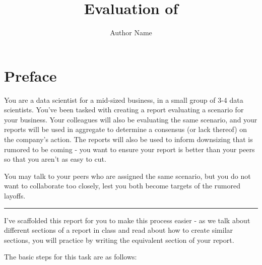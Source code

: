 \documentclass[
  letterpaper,
  DIV=11,
  numbers=noendperiod]{scrreprt}
\title{Evaluation of}
\author{Author Name}
\date{}
\renewcommand*\contentsname{Table of contents}
\newcommand\contentsname{Table of contents}
\begin{document}
\maketitle
\ifdefined\Shaded\renewenvironment{Shaded}{\begin{tcolorbox}[breakable, borderline west={3pt}{0pt}{shadecolor}, interior hidden, boxrule=0pt, sharp corners, frame hidden, enhanced]}{\end{tcolorbox}}\fi

\renewcommand*\contentsname{Table of contents}
{
\hypersetup{linkcolor=}
\setcounter{tocdepth}{2}
\tableofcontents
}

\hypertarget{preface}{%
\chapter*{Preface}\label{preface}}


You are a data scientist for a mid-sized business, in a small group of
3-4 data scientists. You've been tasked with creating a report
evaluating a scenario for your business. Your colleagues will also be
evaluating the same scenario, and your reports will be used in aggregate
to determine a consensus (or lack thereof) on the company's action. The
reports will also be used to inform downsizing that is rumored to be
coming - you want to ensure your report is better than your peers so
that you aren't as easy to cut.

You may talk to your peers who are assigned the same scenario, but you
do not want to collaborate too closely, lest you both become targets of
the rumored layoffs.

\begin{center}\rule{0.5\linewidth}{0.5pt}\end{center}

I've scaffolded this report for you to make this process easier - as we
talk about different sections of a report in class and read about how to
create similar sections, you will practice by writing the equivalent
section of your report.

The basic steps for this task are as follows:
\end{document}

